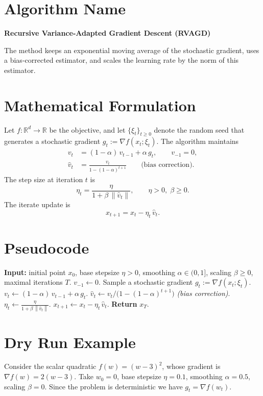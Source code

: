 \documentclass{article}
\newcommand{\norm}[1]{\left\lVert #1\right\rVert}
\begin{document}
\section*{Algorithm Name}
\textbf{Recursive Variance‑Adapted Gradient Descent (RVAGD)}  

The method keeps an exponential moving average of the stochastic gradient, uses a bias‑corrected estimator, and scales the learning rate by the norm of this estimator.

\section*{Mathematical Formulation}
Let $f:\mathbb{R}^d\to\mathbb{R}$ be the objective, and let $\{ \xi_t\}_{t\ge 0}$ denote the random seed that generates a stochastic gradient $g_t:=\nabla f(x_t;\xi_t)$.  
The algorithm maintains
\[
\begin{aligned}
v_t &= (1-\alpha)\,v_{t-1} + \alpha\, g_t ,\qquad v_{-1}=0, \tag{1}\\[4pt]
\hat v_t &= \frac{v_t}{1-(1-\alpha)^{t+1}} \qquad\text{(bias correction).} \tag{2}
\end{aligned}
\]
The step size at iteration $t$ is
\[
\eta_t = \frac{\eta}{1+\beta\,\norm{\hat v_t}}, \qquad \eta>0,\;\beta\ge 0. \tag{3}
\]
The iterate update is
\[
x_{t+1}=x_t-\eta_t \,\hat v_t . \tag{4}
\]

\section*{Pseudocode}
\begin{algorithm}[H]
\caption{Recursive Variance‑Adapted Gradient Descent (RVAGD)}
\begin{algorithmic}[1]
\STATE \textbf{Input:} initial point $x_0$, base stepsize $\eta>0$, smoothing $\alpha\in(0,1]$, scaling $\beta\ge0$, maximal iterations $T$.
\STATE $v_{-1}\gets 0$.
    \STATE Sample a stochastic gradient $g_t:=\nabla f(x_t;\xi_t)$.
    \STATE $v_t\gets (1-\alpha)\,v_{t-1}+\alpha\,g_t$.
    \STATE $\hat v_t\gets v_t/\bigl(1-(1-\alpha)^{t+1}\bigr)$ \hfill\textit{(bias correction)}.
    \STATE $\eta_t\gets \displaystyle\frac{\eta}{1+\beta\,\norm{\hat v_t}}$.
    \STATE $x_{t+1}\gets x_t-\eta_t\,\hat v_t$.
\ENDFOR
\STATE \textbf{Return} $x_T$.
\end{algorithmic}
\end{algorithm}

\section*{Dry Run Example}
Consider the scalar quadratic $f(w)=(w-3)^2$, whose gradient is $\nabla f(w)=2(w-3)$.  
Take $w_0=0$, base stepsize $\eta=0.1$, smoothing $\alpha=0.5$, scaling $\beta=0$.  
Since the problem is deterministic we have $g_t=\nabla f(w_t)$.
\end{document}

